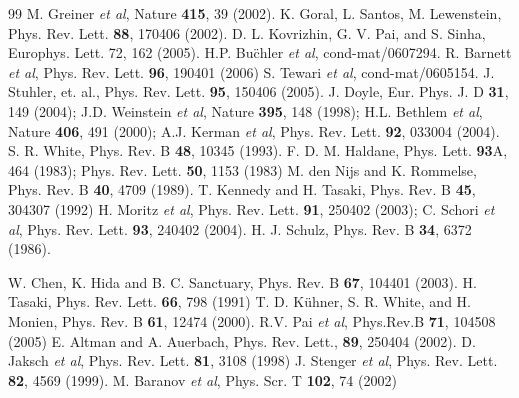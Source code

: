 \documentclass[prb,twocolumn,,amsmath,amssymb,floatfix]{revtex4}
\def \etal{{\it {et al}}}
\begin{document}
\begin{thebibliography}{99}
 M. Greiner \etal, Nature {\bf 415}, 39 (2002).
 K. Goral, L. Santos, M. Lewenstein, Phys. Rev. Lett. {\bf 88}, 170406 (2002).
 D. L. Kovrizhin, G. V. Pai, and S. Sinha, Europhys. Lett. 72, 162 (2005).
 H.P. Bu\"chler \etal, cond-mat/0607294.
 R. Barnett \etal,
Phys. Rev. Lett. {\bf 96}, 190401 (2006)
 S. Tewari \etal, cond-mat/0605154.
 J. Stuhler, et. al., Phys. Rev. Lett. {\bf 95}, 150406 (2005).
 J. Doyle, Eur. Phys. J. D {\bf 31}, 149 (2004); J.D. Weinstein
\etal, Nature {\bf 395}, 148 (1998); H.L. Bethlem \etal, Nature {\bf
406}, 491 (2000); A.J. Kerman \etal, Phys. Rev. Lett. {\bf 92},
033004 (2004).
 S. R. White, Phys. Rev. B {\bf 48}, 10345 (1993).
 F. D. M. Haldane, Phys. Lett. {\bf 93}A, 464 (1983); Phys. Rev. Lett. {\bf 50}, 1153 (1983)
 M. den Nijs and K. Rommelse, Phys. Rev. B {\bf 40}, 4709 (1989).
 T. Kennedy and H. Tasaki, Phys. Rev. B {\bf 45}, 304307 (1992)
 H. Moritz \etal, Phys. Rev. Lett. {\bf 91}, 250402 (2003);
 C. Schori \etal, Phys. Rev. Lett. {\bf 93}, 240402 (2004).
 H. J. Schulz, Phys. Rev. B {\bf 34}, 6372 (1986).

 W. Chen, K. Hida and B. C. Sanctuary, Phys. Rev. B {\bf 67}, 104401 (2003).
 H. Tasaki, Phys. Rev. Lett. {\bf 66}, 798 (1991)
 T. D. K\"uhner, S. R. White, and H. Monien, Phys. Rev. B {\bf 61}, 12474 (2000). R.V. Pai \etal, Phys.Rev.B {\bf 71}, 104508 (2005) 
 E. Altman and A. Auerbach, Phys. Rev. Lett., {\bf
89}, 250404 (2002).
 D. Jaksch \etal, Phys. Rev. Lett. \textbf{81}, 3108 (1998)
 J. Stenger \etal, Phys. Rev. Lett. \textbf{82}, 4569 (1999).
 M. Baranov \etal, Phys. Scr. T {\bf 102}, 74 (2002)

\end{thebibliography}
\end{document}
